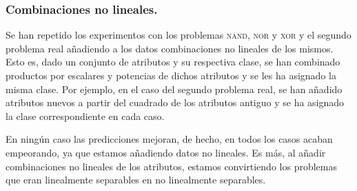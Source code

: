 \documentclass[spanish]{assignment}
\begin{document}
	\subsubsection{Combinaciones no lineales.}
	Se han repetido los experimentos con los problemas \textsc{nand}, \textsc{nor} y \textsc{xor} y el segundo problema real añadiendo a los datos combinaciones no lineales de los mismos. Esto es, dado un conjunto de atributos y su respectiva clase, se han combinado productos por escalares y potencias de dichos atributos y se les ha asignado la misma clase. Por ejemplo, en el caso del segundo problema real, se han añadido atributos nuevos a partir del cuadrado de los atributos antiguo y se ha asignado la clase correspondiente en cada caso.
	
	En ningún caso las predicciones mejoran, de hecho, en todos los casos acaban empeorando, ya que estamos añadiendo datos no lineales. Es más, al añadir combinaciones no lineales de los atributos, estamos convirtiendo los problemas que eran linealmente separables en no linealmente separables. 
\end{document}
